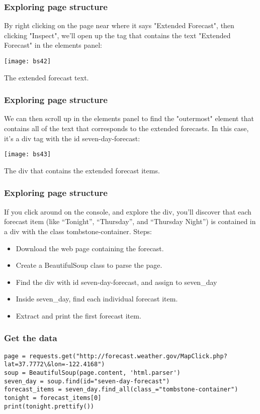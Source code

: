 \begin{frame}[fragile]\frametitle{Exploring page structure}
By right clicking on the page near where it says "Extended Forecast", then clicking "Inspect", we'll open up the tag that contains the text "Extended Forecast" in the elements panel:
	    \begin{center}
\texttt{[image: bs42]}
\end{center}
The extended forecast text.
\end{frame}

\begin{frame}[fragile]\frametitle{Exploring page structure}
We can then scroll up in the elements panel to find the "outermost" element that contains all of the text that corresponds to the extended forecasts. In this case, it's a div tag with the id seven-day-forecast:
	    \begin{center}
\texttt{[image: bs43]}
\end{center}
The div that contains the extended forecast items.
\end{frame}

\begin{frame}[fragile]\frametitle{Exploring page structure}
 If you click around on the console, and explore the div, you'll discover that each forecast item (like ``Tonight'', ``Thursday'', and ``Thursday Night'') is contained in a div with the class tombstone-container. Steps:
     \begin{itemize}
    \item     Download the web page containing the forecast.
    \item     Create a BeautifulSoup class to parse the page.
    \item     Find the div with id seven-day-forecast, and assign to seven\_day
    \item     Inside seven\_day, find each individual forecast item.
    \item     Extract and print the first forecast item.
	    \end{itemize}
\end{frame}


\begin{frame}[fragile]\frametitle{Get the data}

            \begin{lstlisting}
page = requests.get("http://forecast.weather.gov/MapClick.php?lat=37.7772\&lon=-122.4168")
soup = BeautifulSoup(page.content, 'html.parser')
seven_day = soup.find(id="seven-day-forecast")
forecast_items = seven_day.find_all(class_="tombstone-container")
tonight = forecast_items[0]
print(tonight.prettify())
\end{lstlisting}
\end{frame}


